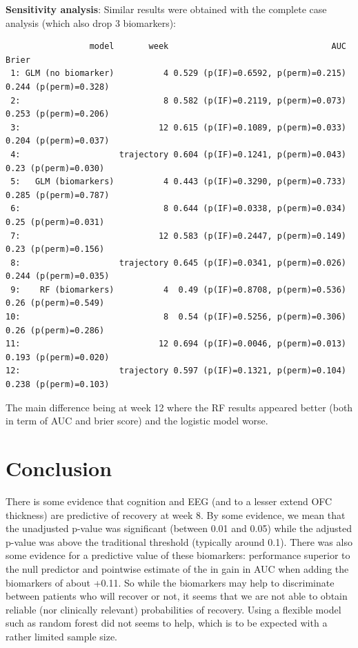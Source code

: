 \documentclass[12pt]{article}
\begin{document}
\textbf{Sensitivity analysis}: Similar results were obtained with the
complete case analysis (which also drop 3 biomarkers):
\label{}
\begin{verbatim}
                 model       week                                 AUC                 Brier
 1: GLM (no biomarker)          4 0.529 (p(IF)=0.6592, p(perm)=0.215) 0.244 (p(perm)=0.328)
 2:                             8 0.582 (p(IF)=0.2119, p(perm)=0.073) 0.253 (p(perm)=0.206)
 3:                            12 0.615 (p(IF)=0.1089, p(perm)=0.033) 0.204 (p(perm)=0.037)
 4:                    trajectory 0.604 (p(IF)=0.1241, p(perm)=0.043)  0.23 (p(perm)=0.030)
 5:   GLM (biomarkers)          4 0.443 (p(IF)=0.3290, p(perm)=0.733) 0.285 (p(perm)=0.787)
 6:                             8 0.644 (p(IF)=0.0338, p(perm)=0.034)  0.25 (p(perm)=0.031)
 7:                            12 0.583 (p(IF)=0.2447, p(perm)=0.149)  0.23 (p(perm)=0.156)
 8:                    trajectory 0.645 (p(IF)=0.0341, p(perm)=0.026) 0.244 (p(perm)=0.035)
 9:    RF (biomarkers)          4  0.49 (p(IF)=0.8708, p(perm)=0.536)  0.26 (p(perm)=0.549)
10:                             8  0.54 (p(IF)=0.5256, p(perm)=0.306)  0.26 (p(perm)=0.286)
11:                            12 0.694 (p(IF)=0.0046, p(perm)=0.013) 0.193 (p(perm)=0.020)
12:                    trajectory 0.597 (p(IF)=0.1321, p(perm)=0.104) 0.238 (p(perm)=0.103)
\end{verbatim}

The main difference being at week 12 where the RF results appeared
better (both in term of AUC and brier score) and the logistic model
worse.

\clearpage
\section{Conclusion}
\label{sec:org529cacc}

There is some evidence that cognition and EEG (and to a lesser extend
OFC thickness) are predictive of recovery at week 8. By some evidence,
we mean that the unadjusted p-value was significant (between 0.01 and
0.05) while the adjusted p-value was above the traditional threshold
(typically around 0.1). There was also some evidence for a predictive
value of these biomarkers: performance superior to the null predictor
and pointwise estimate of the in gain in AUC when adding the
biomarkers of about +0.11. So while the biomarkers may help to
discriminate between patients who will recover or not, it seems that
we are not able to obtain reliable (nor clinically relevant)
probabilities of recovery. \newline Using a flexible model such as
random forest did not seems to help, which is to be expected with a
rather limited sample size.
\end{document}
